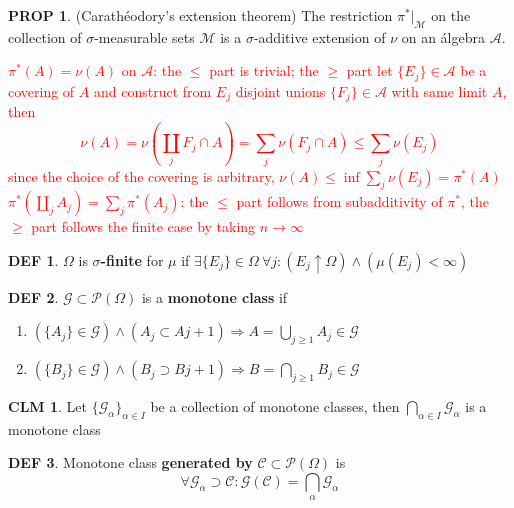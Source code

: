 \documentclass[hidelinks]{article}
\theoremstyle{definition}
\newtheorem*{defin}{DEF}
\theoremstyle{dotless}
\newtheorem{proposition}{PROP}[section]
\newtheorem{claim}{CLM}[section]
\theoremstyle{remark}
\begin{document}
\begin{proposition}(Carathéodory's extension theorem) The restriction $\pi^*|_\mathscr{M}$ on the collection of $\sigma$-measurable sets $\mathscr{M}$ is a $\sigma$-additive extension of $\nu$ on an álgebra $\mathscr{A}$.
\end{proposition}
\textcolor{red}{$\pi^*(A)=\nu(A)$ on $\mathscr{A}$:\newline
the $\leq$ part is trivial; the $\geq$ part let $\{E_j\}\in\mathscr{A}$ be a covering of $A$ and construct from $E_j$ disjoint unions $\{F_j\}\in\mathscr{A}$ with same limit $A$, then
\[\nu(A)=\nu(\coprod_jF_j\cap A)=\sum_j\nu(F_j\cap A)\leq\sum_j\nu(E_j)\]
since the choice of the covering is arbitrary, $\nu(A)\leq\inf\sum\limits_j\nu(E_j)=\pi^*(A)$\newline
$\pi^*(\coprod\limits_jA_j)=\sum\limits_j\pi^*(A_j)$:\newline
the $\leq$ part follows from subadditivity of $\pi^*$, the $\geq$ part follows the finite case by taking $n\to\infty$}

\begin{defin}
$\Omega$ is \textbf{$\sigma$-finite} for $\mu$ if $\exists \{E_j\}\in\Omega\ \forall j:(E_j\uparrow\Omega)\wedge(\mu(E_j)<\infty)$
\end{defin}

\begin{defin}
$\mathscr{G}\subset\mathscr{P}(\Omega)$ is a \textbf{monotone class} if
\begin{enumerate}[label=\arabic*\degree]
    \item $(\{A_j\}\in\mathscr{G})\wedge(A_j\subset A{j+1})\Rightarrow A=\bigcup\limits_{j\geq1}A_j\in\mathscr{G}$
    \item $(\{B_j\}\in\mathscr{G})\wedge(B_j\supset B{j+1})\Rightarrow B=\bigcap\limits_{j\geq1}B_j\in\mathscr{G}$
\end{enumerate}
\end{defin}

\begin{claim}
Let $\{\mathscr{G}_\alpha\}_{\alpha\in I}$ be a collection of monotone classes, then $\bigcap\limits_{\alpha\in I}\mathscr{G}_\alpha$ is a monotone class
\end{claim}

\begin{defin}
Monotone class \textbf{generated by} $\mathscr{C}\subset\mathscr{P}(\Omega)$ is \[\forall\mathscr{G}_\alpha\supset\mathscr{C}:\mathscr{G}(\mathscr{C})=\bigcap\limits_\alpha\mathscr{G}_\alpha\]
\end{defin}
\end{document}
